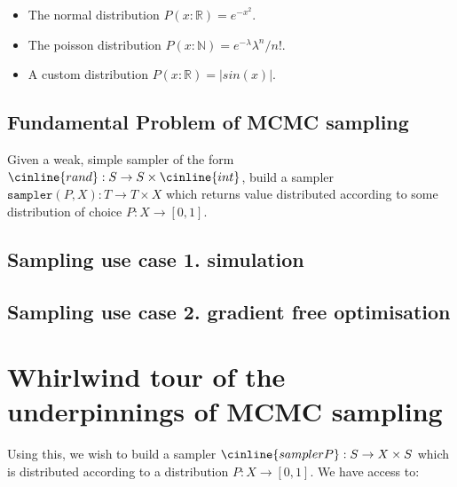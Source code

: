 \documentclass[titlepage]{article}
\newcommand{\N}{\mathbb{N}}
\newcommand{\R}{\mathbb{R}}
\begin{document}
\begin{itemize}
    \item The normal distribution $P(x: \R) = e^{-x^2}$.
    \item The poisson distribution $P(x: \N) = e^{-\lambda} \lambda^n/n!$.
    \item A custom distribution $P(x: \R) = |sin(x)|$.
\end{itemize}

\subsection{Fundamental Problem of MCMC sampling}
Given a weak, simple sampler of the form $\cinline{rand} : S \rightarrow S \times \cinline{int}$,
build a sampler $\texttt{sampler}(P, X): T \rightarrow T \times X$ which returns
value distributed according to some distribution of choice $P: X \rightarrow [0, 1]$.

\subsection{Sampling use case 1. simulation}
\subsection{Sampling use case 2. gradient free optimisation}
\section{Whirlwind tour of the underpinnings of MCMC sampling}
Using this, we wish to build a sampler $\cinline{samplerP}: S \rightarrow X \times S$
which is distributed according to a distribution $P: X \rightarrow [0, 1]$. We
have access to:
\end{document}

